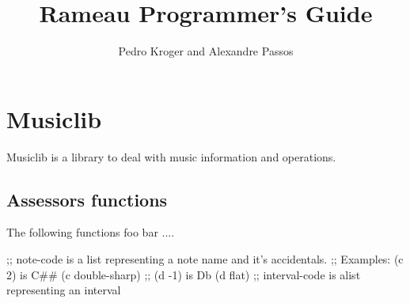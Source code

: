 \documentclass{article}
\title{Rameau Programmer's Guide}
\author{Pedro Kroger and Alexandre Passos}
\begin{document}
\maketitle

\section{Musiclib}
\label{sec:musiclib}

Musiclib is a library to deal with music information and operations.

\subsection{Assessors functions}
\label{sec:accessors-functions}

The following functions foo bar ....

;; note-code is a list representing a note name and it's accidentals.
;;   Examples: (c 2)  is C## (c double-sharp)
;;             (d -1) is Db (d flat)
;; interval-code is alist representing an interval




\end{document}
